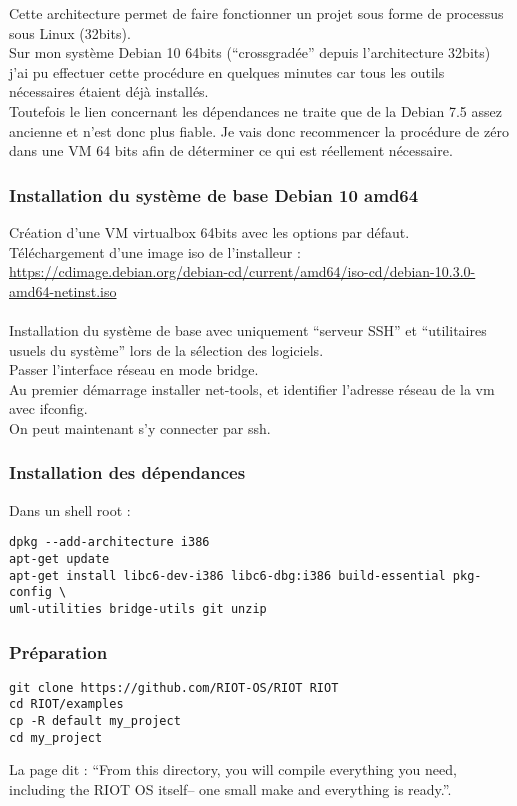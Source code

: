 Cette architecture permet de faire fonctionner un projet sous forme de processus sous
Linux (32bits).\\

Sur mon système Debian 10 64bits (\enquote{crossgradée} depuis l'architecture 32bits)
j'ai pu effectuer cette procédure en quelques minutes car tous les outils nécessaires
étaient déjà installés.\\

Toutefois le lien concernant les dépendances ne traite que de la Debian 7.5 assez
ancienne et n'est donc plus fiable. Je vais donc recommencer la procédure de zéro
dans une VM 64 bits afin de déterminer ce qui est réellement nécessaire.

\subsubsection{Installation du système de base Debian 10 amd64}
Création d'une VM virtualbox 64bits avec les options par défaut.\\

Téléchargement d'une image iso de l'installeur :\\
{\footnotesize
\url{https://cdimage.debian.org/debian-cd/current/amd64/iso-cd/debian-10.3.0-amd64-netinst.iso}\\
}\\
Installation du système de base avec uniquement \enquote{serveur SSH} et
\enquote{utilitaires usuels du système} lors de la sélection des logiciels.\\

Passer l'interface réseau en mode bridge.\\

Au premier démarrage installer net-tools, et identifier l'adresse réseau de la vm
avec ifconfig.\\

On peut maintenant s'y connecter par ssh.

\subsubsection{Installation des dépendances}
Dans un shell root :
\begin{verbatim}
dpkg --add-architecture i386
apt-get update
apt-get install libc6-dev-i386 libc6-dbg:i386 build-essential pkg-config \
uml-utilities bridge-utils git unzip
\end{verbatim}

\subsubsection{Préparation}
\begin{verbatim}
git clone https://github.com/RIOT-OS/RIOT RIOT
cd RIOT/examples
cp -R default my_project
cd my_project
\end{verbatim}
La page dit : \enquote{From this directory, you will compile everything you need,
including the RIOT OS itself– one small make and everything is ready.}.\\


